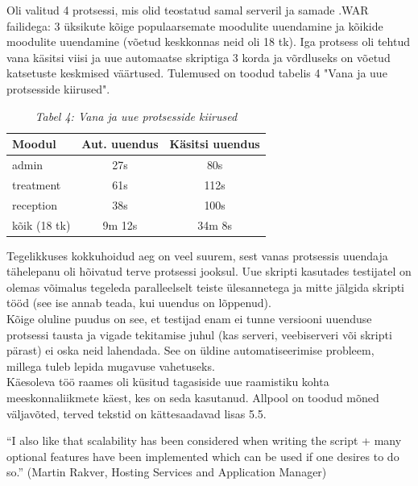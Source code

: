 \documentclass[12pt]{report}
\begin{document}
  Oli valitud 4 protsessi, mis olid teostatud samal serveril ja samade .WAR failidega: 3 üksikute kõige populaarsemate moodulite uuendamine ja kõikide moodulite uuendamine (võetud keskkonnas neid oli 18 tk). Iga protsess oli tehtud vana käsitsi viisi ja uue automaatse skriptiga 3 korda ja võrdluseks on võetud katsetuste keskmised väärtused. Tulemused on toodud tabelis 4 "Vana ja uue protsesside kiirused".
  
  \begin{table}[!htbp]
    \begin{center}
      \begin{tabular}{| l | c | c |}
        \hline
         \textbf{Moodul} & \textbf{Aut. uuendus} & \textbf{Käsitsi uuendus}\\
        \hline
        admin & 27s & 80s\\
        treatment & 61s & 112s\\
        reception & 38s & 100s\\
        kõik (18 tk) & 9m 12s & 34m 8s\\
        \hline
      \end{tabular}
      \caption*{\textit{Tabel 4: Vana ja uue protsesside kiirused}}
    \end{center}
  \end{table}
  
  Tegelikkuses kokkuhoidud aeg on veel suurem, sest vanas protsessis uuendaja tähelepanu oli hõivatud terve protsessi jooksul. Uue skripti kasutades testijatel on olemas võimalus tegeleda paralleelselt teiste ülesannetega ja mitte jälgida skripti tööd (see ise annab teada, kui uuendus on lõppenud).\\
  
  Kõige oluline puudus on see, et testijad enam ei tunne versiooni uuenduse protsessi tausta ja vigade tekitamise juhul (kas serveri, veebiserveri või skripti pärast) ei oska neid lahendada. See on üldine automatiseerimise probleem, millega tuleb lepida mugavuse vahetuseks.\\
  
   Käesoleva töö raames oli küsitud tagasiside uue raamistiku kohta meeskonnaliikmete käest, kes on seda kasutanud. Allpool on toodud mõned väljavõted, terved tekstid on kättesaadavad lisas 5.5.\\
   
   \begin{displayquote}
   ``I also like that scalability has been considered when writing the script + many optional features have been implemented which can be used if one desires to do so.'' (Martin Rakver, Hosting Services and Application Manager)
   \end{displayquote}
   
\end{document}
